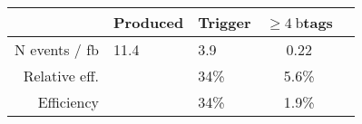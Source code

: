 \documentclass[border=5pt]{standalone}
\begin{document}
  \minipage{18cm}

  \centering
  \small
  
  \begin{tabular}{r l l  c c}
  \hline
                             & Produced  & Trigger & $\geq 4 \ \textrm{b}$tags \\
  \hline
   N events / fb     & 11.4     & 3.9   & 0.22 \\
   Relative eff.              &          & 34\%  & 5.6\% \\
   Efficiency                 &          & 34\%  & 1.9\% \\
  \hline
 \end{tabular}

  \endminipage
\end{document}
